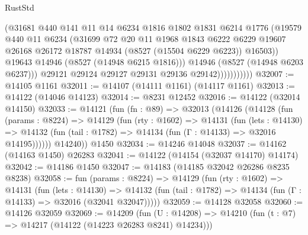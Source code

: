 \begin{lexlean}{RustStd}
\begin{coremodule}
                            (@31681
                              @440
                              @141
                              @11
                              @14
                              @6234
                              @1816
                              @1802
                              @1831
                              @6214
                              @1776
                              (@19579
                                @440
                                @11
                                @6234
                                (@31699
                                  @72
                                  @20
                                  @11
                                  @1968
                                  @1843
                                  @6222
                                  @6229
                                  @19607
                                  @26168
                                  @26172
                                  @18787
                                  @14934
                                  (@8527 (@15504 @6229 @6223))
                                  @16503))
                              @19643
                              @14946
                              (@8527 (@14948 @6215 @1816)))
                            @14946
                            (@8527 (@14948 @6203 @6237)))
                          @29121
                          @29124
                          @29127
                          @29131
                          @29136
                          @29142)))))))))))
@32007 := @14105 @1161
@32011 := @14107 (@14111 @1161) (@14117 @1161)
@32013 := @14122 (@14046 @14123)
@32014 := @8231 @12452
@32016 := @14122 (@32014 @14150)
@32033 := @14121
    (fun (fn : @89) =>
    @32013
      (@14126
        (@14128
          (fun (params : @8224) =>
          @14129
            (fun (rty : @1602) =>
            @14131
              (fun (lets : @14130) =>
              @14132 (fun (tail : @1782) => @14134 (fun (Γ : @14133) => @32016 @14195))))))
        @14240))
    @1450
@32034 := @14246 @14048
@32037 := @14162 (@14163 @1450) @26283
@32041 := @14122 (@14154 (@32037 @14170) @14174)
@32042 := @14186 @1450
@32047 := @14183 (@14185 @32042 @26286 @8235 @8238)
@32058 := fun (params : @8224) =>
  @14129
    (fun (rty : @1602) =>
    @14131
      (fun (lets : @14130) =>
      @14132 (fun (tail : @1782) => @14134 (fun (Γ : @14133) => @32016 (@32041 @32047)))))
@32059 := @14128 @32058
@32060 := @14126 @32059
@32069 := @14209
    (fun (U : @14208) => @14210 (fun (t : @7) => @14217 (@14122 (@14223 @26283 @8241) @14234)))

\end{coremodule}
\end{lexlean}
